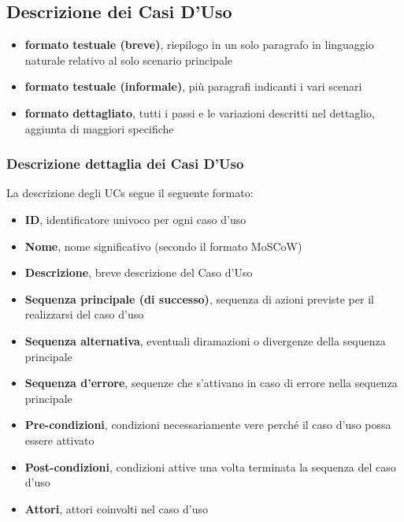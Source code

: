 \subsection{Descrizione dei Casi D'Uso}
\begin{itemize}
    \item \textbf{formato testuale (breve)}, riepilogo in un solo paragrafo in linguaggio naturale relativo al solo scenario principale
    \item \textbf{formato testuale (informale)}, più paragrafi indicanti i vari scenari
    \item \textbf{formato dettagliato}, tutti i passi e le variazioni descritti nel dettaglio, aggiunta di maggiori specifiche
\end{itemize}
\subsubsection{Descrizione dettaglia dei Casi D'Uso}
La descrizione degli UCs segue il seguente formato:
\begin{itemize}
    \item \textbf{ID}, identificatore univoco per ogni caso d'uso
    \item \textbf{Nome}, nome significativo (secondo il formato MoSCoW)
    \item \textbf{Descrizione}, breve descrizione del Caso d'Uso
    \item \textbf{Sequenza principale (di successo)}, sequenza di azioni previste per il realizzarsi del caso d'uso
    \item \textbf{Sequenza alternativa}, eventuali diramazioni o divergenze della sequenza principale
    \item \textbf{Sequenza d'errore}, sequenze che s'attivano in caso di errore nella sequenza principale
    \item \textbf{Pre-condizioni}, condizioni necessariamente vere perché il caso d'uso possa essere attivato
    \item \textbf{Post-condizioni}, condizioni attive una volta terminata la sequenza del caso d'uso
    \item \textbf{Attori}, attori coinvolti nel caso d'uso
\end{itemize}
